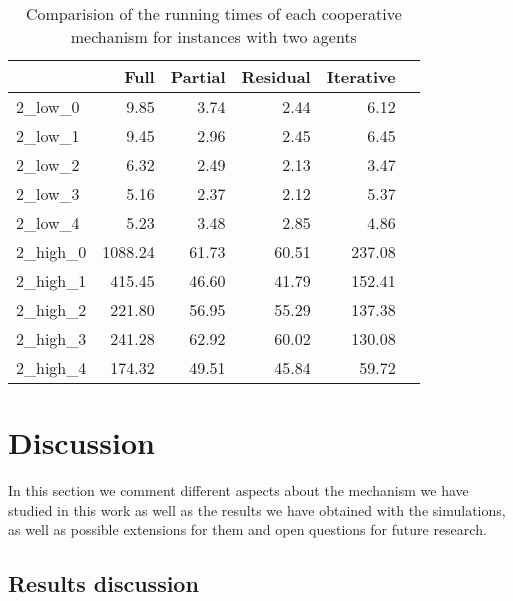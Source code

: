 \documentclass[review]{elsarticle}
\begin{document}
\begin{table}[h!]
\centering
\caption{Comparision of the running times of each cooperative mechanism for instances with two agents\label{tb:2_times}}
\begin{tabular}{lrrrrr}
\toprule
{} &     Full &  Partial &  Residual &  Iterative \\
\midrule
2\_low\_0  &               9.85 &     3.74 &      2.44 &       6.12 \\
2\_low\_1  &                 9.45 &     2.96 &      2.45 &       6.45 \\
2\_low\_2  &                6.32 &     2.49 &      2.13 &       3.47 \\
2\_low\_3  &                 5.16 &     2.37 &      2.12 &       5.37 \\
2\_low\_4  &                 5.23 &     3.48 &      2.85 &       4.86 \\
2\_high\_0 &             1088.24 &    61.73 &     60.51 &     237.08 \\
2\_high\_1 &              415.45 &    46.60 &     41.79 &     152.41 \\
2\_high\_2 &              221.80 &    56.95 &     55.29 &     137.38 \\
2\_high\_3 &              241.28 &    62.92 &     60.02 &     130.08 \\
2\_high\_4 &              174.32 &    49.51 &     45.84 &      59.72 \\
\bottomrule
\end{tabular}
\end{table}





\section{Discussion} \label{seq:discussion}

In this section we comment different aspects about the mechanism we have studied in this work as well as the results we have obtained with the simulations, as well as possible extensions for them and open questions for future research.

\subsection{Results discussion}
\end{document}

